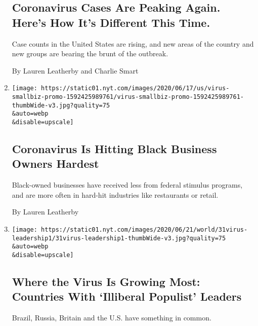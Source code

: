 \begin{enumerate}
  \hypertarget{coronavirus-cases-are-peaking-again-heres-how-its-different-this-time}{%
  \subsection{Coronavirus Cases Are Peaking Again. Here's How It's
  Different This
  Time.}\label{coronavirus-cases-are-peaking-again-heres-how-its-different-this-time}}

  Case counts in the United States are rising, and new areas of the
  country and new groups are bearing the brunt of the outbreak.

  By Lauren Leatherby and Charlie Smart
\item
  \href{/interactive/2020/06/18/us/coronavirus-black-owned-small-business.html}{}

  \texttt{[image: https://static01.nyt.com/images/2020/06/17/us/virus-smallbiz-promo-1592425989761/virus-smallbiz-promo-1592425989761-thumbWide-v3.jpg?quality=75\\\&auto=webp\\\&disable=upscale]}

  \hypertarget{coronavirus-is-hitting-black-business-owners-hardest}{%
  \subsection{Coronavirus Is Hitting Black Business Owners
  Hardest}\label{coronavirus-is-hitting-black-business-owners-hardest}}

  Black-owned businesses have received less from federal stimulus
  programs, and are more often in hard-hit industries like restaurants
  or retail.

  By Lauren Leatherby
\item
  \href{/2020/06/02/briefing/coronavirus-populist-leaders.html}{}

  \texttt{[image: https://static01.nyt.com/images/2020/06/21/world/31virus-leadership1/31virus-leadership1-thumbWide-v3.jpg?quality=75\\\&auto=webp\\\&disable=upscale]}

  \hypertarget{where-the-virus-is-growing-most-countries-with-illiberal-populist-leaders}{%
  \subsection{Where the Virus Is Growing Most: Countries With `Illiberal
  Populist'
  Leaders}\label{where-the-virus-is-growing-most-countries-with-illiberal-populist-leaders}}

  Brazil, Russia, Britain and the U.S. have something in common.


\end{enumerate}
